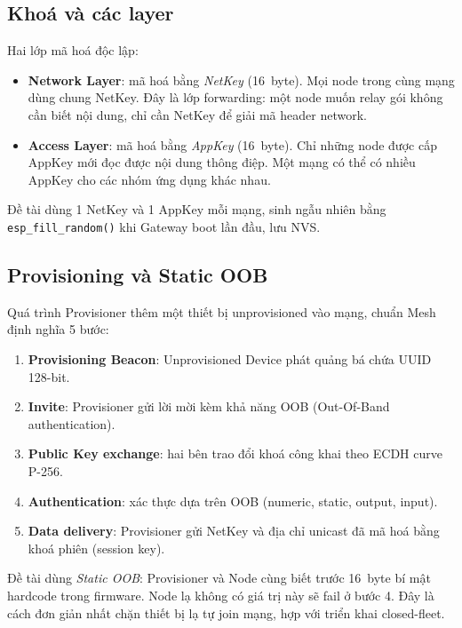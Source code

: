 \subsection{Khoá và các layer}

Hai lớp mã hoá độc lập:

\begin{itemize}
    \item \textbf{Network Layer}: mã hoá bằng \textit{NetKey} (16~byte). Mọi node trong cùng mạng dùng chung NetKey. Đây là lớp forwarding: một node muốn relay gói không cần biết nội dung, chỉ cần NetKey để giải mã header network.
    \item \textbf{Access Layer}: mã hoá bằng \textit{AppKey} (16~byte). Chỉ những node được cấp AppKey mới đọc được nội dung thông điệp. Một mạng có thể có nhiều AppKey cho các nhóm ứng dụng khác nhau.
\end{itemize}

Đề tài dùng 1 NetKey và 1 AppKey mỗi mạng, sinh ngẫu nhiên bằng \texttt{esp\_fill\_random()} khi Gateway boot lần đầu, lưu NVS.

\subsection{Provisioning và Static OOB}

Quá trình Provisioner thêm một thiết bị unprovisioned vào mạng, chuẩn Mesh định nghĩa 5 bước:

\begin{enumerate}
    \item \textbf{Provisioning Beacon}: Unprovisioned Device phát quảng bá chứa UUID 128-bit.
    \item \textbf{Invite}: Provisioner gửi lời mời kèm khả năng OOB (Out-Of-Band authentication).
    \item \textbf{Public Key exchange}: hai bên trao đổi khoá công khai theo ECDH curve P-256.
    \item \textbf{Authentication}: xác thực dựa trên OOB (numeric, static, output, input).
    \item \textbf{Data delivery}: Provisioner gửi NetKey và địa chỉ unicast đã mã hoá bằng khoá phiên (session key).
\end{enumerate}

Đề tài dùng \textit{Static OOB}: Provisioner và Node cùng biết trước 16~byte bí mật hardcode trong firmware. Node lạ không có giá trị này sẽ fail ở bước 4. Đây là cách đơn giản nhất chặn thiết bị lạ tự join mạng, hợp với triển khai closed-fleet.

